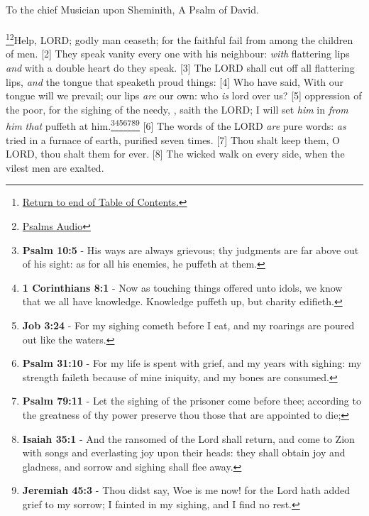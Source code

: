 \textcolor[cmyk]{0.99998,1,0,0}{To the chief Musician upon Sheminith, A Psalm of David.}\\
\\
\footnote{\textcolor[cmyk]{0.99998,1,0,0}{\hyperlink{TOC}{Return to end of Table of Contents.}}}\footnote{\href{https://www.audioverse.org/english/audiobibles/books/ENGKJV/O/Ps/1}{\textcolor[cmyk]{0.99998,1,0,0}{Psalms Audio}}}\textcolor[cmyk]{0.99998,1,0,0}{Help, LORD;  godly man ceaseth; for the faithful fail from among the children of men.}
[2] \textcolor[cmyk]{0.99998,1,0,0}{They speak vanity every one with his neighbour: \emph{with} flattering lips \emph{and} with a double heart do they speak.}
[3] \textcolor[cmyk]{0.99998,1,0,0}{The LORD shall cut off all flattering lips, \emph{and} the tongue that speaketh proud things:}
[4] \textcolor[cmyk]{0.99998,1,0,0}{Who have said, With our tongue will we prevail; our lips \emph{are} our own: who \emph{is} lord over us?}
[5] \textcolor[cmyk]{0.99998,1,0,0}{ oppression of the poor, for the sighing of the needy, , saith the LORD; I will set \emph{him} in  \emph{from} \emph{him} \emph{that} puffeth at him.}\footnote{\textbf{Psalm 10:5} - His ways are always grievous; thy judgments are far above out of his sight: as for all his enemies, he puffeth at them.}\footnote{\textbf{1 Corinthians 8:1} - Now as touching things offered unto idols, we know that we all have knowledge. Knowledge puffeth up, but charity edifieth.}\footnote{\textbf{Job 3:24} - 
For my sighing cometh before I eat, and my roarings are poured out like the waters.}\footnote{\textbf{Psalm 31:10} - For my life is spent with grief, and my years with sighing: my strength faileth because of mine iniquity, and my bones are consumed.}\footnote{\textbf{Psalm 79:11} - Let the sighing of the prisoner come before thee; according to the greatness of thy power preserve thou those that are appointed to die;}\footnote{\textbf{Isaiah 35:1} - 
And the ransomed of the Lord shall return, and come to Zion with songs and everlasting joy upon their heads: they shall obtain joy and gladness, and sorrow and sighing shall flee away.}\footnote{\textbf{Jeremiah 45:3} - 
Thou didst say, Woe is me now! for the Lord hath added grief to my sorrow; I fainted in my sighing, and I find no rest.}
[6] \textcolor[cmyk]{0.99998,1,0,0}{The words of the LORD \emph{are} pure words: \emph{as}  tried in a furnace of earth, purified seven times.}
[7] \textcolor[cmyk]{0.99998,1,0,0}{Thou shalt keep them, O LORD, thou shalt  them  for ever.}
[8] \textcolor[cmyk]{0.99998,1,0,0}{The wicked walk on every side, when the vilest men are exalted.}